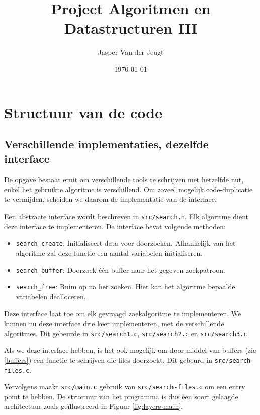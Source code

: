 \documentclass[a4paper,11pt]{article}
\title{Project Algoritmen en Datastructuren III}
\author{Jasper Van der Jeugt}
\date{\today}
\begin{document}
\maketitle
\tableofcontents

\section{Structuur van de code}

\subsection{Verschillende implementaties, dezelfde interface}
\label{interface}

De opgave bestaat eruit om verschillende tools te schrijven met hetzelfde nut,
enkel het gebruikte algoritme is verschillend. Om zoveel mogelijk
code-duplicatie te vermijden, scheiden we daarom de implementatie van de
interface.

Een abstracte interface wordt beschreven in \verb#src/search.h#. Elk algoritme
dient deze interface te implementeren. De interface bevat volgende methoden:

\begin{itemize}
    \item \verb#search_create#: Initialiseert data voor doorzoeken. Afhankelijk
    van het algoritme zal deze functie een aantal variabelen initialiseren.
    \item \verb#search_buffer#: Doorzoek \'e\'en buffer naar het gegeven
    zoekpatroon.
    \item \verb#search_free#: Ruim op na het zoeken. Hier kan het algoritme
    bepaalde variabelen dealloceren.
\end{itemize}

Deze interface laat toe om elk gevraagd zoekalgoritme te implementeren. We
kunnen nu deze interface drie keer implementeren, met de verschillende
algoritmes. Dit gebeurde in \verb#src/search1.c#, \verb#src/search2.c# en
\verb#src/search3.c#.

Als we deze interface hebben, is het ook mogelijk om door middel van buffers
(zie \ref{buffers}) een functie te schrijven die files doorzoekt. Dit gebeurd in
\verb#src/search-files.c#.

Vervolgens maakt \verb#src/main.c# gebruik van \verb#src/search-files.c# om een
entry point te hebben. De structuur van het programma is dus een soort gelaagde
architectuur zoals ge\"illustreerd in Figuur \ref{fig:layers-main}.
\end{document}
